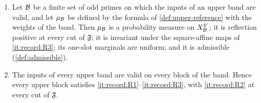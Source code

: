 \begin{lemma}\label{lem:upper-reference-rp}
\leavevmode
\begin{enumerate}[label=(\roman*)]
\item Let $\mathcal B$ be a finite set of odd primes on which the inputs of an upper band are
 valid, and let $\mu_\mathcal B$ be defined by the formula of \cref{def:upper-reference} with
 the weights of the band. Then $\mu_\mathcal B$ is a probability measure on $X_\mathcal B^V$; it is reflection
 positive at every cut of $\mathfrak F$; it is invariant under the square-affine maps of
 \ref{it:record:R3}; its one-slot marginals are uniform; and it is admissible
 (\cref{def:admissible}).
\item The inputs of every upper band are valid on every block of the band. Hence every
 upper block satisfies \ref{it:record:R1}--\ref{it:record:R3}, with \ref{it:record:R2} at
 every cut of $\mathfrak F$.
\end{enumerate}
\end{lemma}


